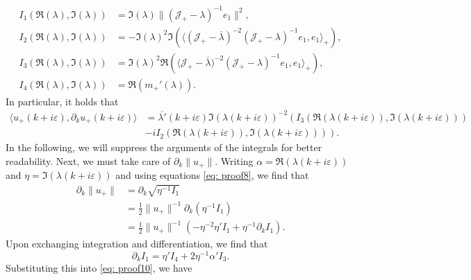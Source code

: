 \documentclass[a4paper,reqno,twoside]{amsart}
\numberwithin{equation}{section}
\theoremstyle{definition}
\renewcommand{\bar}[1]{\overline{#1}}
\newcommand{\<}{\ensuremath \leq}
\renewcommand{\>}{\ensuremath \geq}
\renewcommand{\epsilon}{\varepsilon}
\begin{document}
\begin{equation}\label{eq: proof8}
    \begin{aligned}
        I_1 (\Re(\lambda),\Im(\lambda)) &= \Im(\lambda)\lVert (\mathcal{J}_+-\lambda)^{-1}e_1\rVert^2 ,\\
        I_2 (\Re(\lambda),\Im(\lambda)) &= -\Im(\lambda)^2\Im\left(\langle (\mathcal{J}_+-\bar{\lambda})^{-2}(\mathcal{J}_+-\lambda)^{-1}e_1, e_1\rangle_+\right) ,\\
        I_3 (\Re(\lambda),\Im(\lambda)) &= \Im(\lambda)^2\Re\left(\langle \mathcal{J}_+-\bar{\lambda})^{-2}(\mathcal{J}_+-\lambda)^{-1}e_1, e_1\rangle_+\right) ,\\
        I_4(\Re(\lambda),\Im(\lambda)) &=\Re(m_+'(\lambda)).
    \end{aligned}
\end{equation}
In particular, it holds that
\begin{equation}\label{eq: proof9}
    \begin{aligned}
        \langle u_+(k+i\epsilon),\partial_k u_+(k+i\epsilon)\rangle &= \overline{\lambda'}(k+i\epsilon)\Im(\lambda(k+i\epsilon))^{-2}\left(I_3(\Re(\lambda(k+i\epsilon)),\Im(\lambda(k+i\epsilon)))\right.\\ 
        &\left.- i I_2(\Re(\lambda(k+i\epsilon)),\Im(\lambda(k+i\epsilon)))\right).
    \end{aligned}
\end{equation}
In the following, we will suppress the arguments of the integrals for better readability. Next, we must take care of $\partial_k\lVert u_+\rVert$. Writing $\alpha = \Re(\lambda(k+i\epsilon))$ and $\eta = \Im(\lambda(k+i\epsilon))$ and using equations \eqref{eq: proof8}, we find that
\begin{equation}\label{eq: proof10}
    \begin{aligned}
        \partial_k\lVert u_+\lVert &= \partial_k\sqrt{\eta^{-1}I_1}\\
        &=\frac{1}{2}\lVert u_+\rVert^{-1}\partial_k(\eta^{-1}I_1)\\\
        &=\frac{1}{2}\lVert u_+\rVert^{-1}\left(-\eta^{-2}\eta'I_1 + \eta^{-1}\partial_kI_1\right).
    \end{aligned}
\end{equation}
Upon exchanging integration and differentiation, we find that
\begin{equation}
    \partial_kI_1 = \eta'I_4+2\eta^{-1}\alpha'I_3.
\end{equation}
Substituting this into \eqref{eq: proof10}, we have
\end{document}
